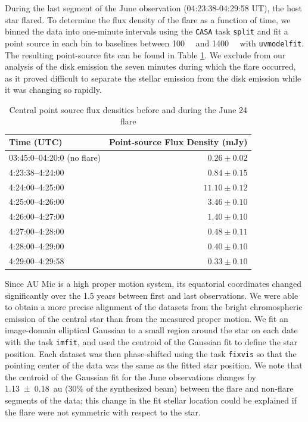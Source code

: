 \documentclass[modern]{aastex62}
\begin{document}
During the last segment of the June observation (04:23:38-04:29:58 UT), the host star flared. 
To determine the flux density of the flare as a function of time, we binned the data into one-minute intervals using the \texttt{CASA} task \texttt{split} and fit a point source in each bin to baselines between \SI{100}{\kilo \lambda} and \SI{1400}{\kilo \lambda} with \texttt{uvmodelfit}. 
The resulting point-source fits can be found in Table \ref{tab:flare fluxes}. 
We exclude from our analysis of the disk emission the seven minutes during which the flare occurred, as it proved difficult to separate the stellar emission from the disk emission while it was changing so rapidly.

\begin{table}	
  \centering
  \begin{tabular}{lr}
    \toprule
    Time (UTC) & Point-source Flux Density (\si{mJy}) \\
    \midrule
    03:45:0--04:20:0 (no flare) & $0.26 \pm 0.02$\\
  	4:23:38--4:24:00 & $0.84  \pm 0.15$ \\
  	4:24:00--4:25:00 & $11.10 \pm 0.12$ \\
  	4:25:00--4:26:00 & $3.46  \pm 0.10$ \\
  	4:26:00--4:27:00 & $1.40  \pm 0.10$ \\
  	4:27:00--4:28:00 & $0.48  \pm 0.11$ \\
  	4:28:00--4:29:00 & $0.40  \pm 0.10$ \\
  	4:29:00--4:29:58 & $0.33  \pm 0.10$\\
    \bottomrule
  \end{tabular}
	\caption{Central point source flux densities before and during the June 24 flare}
  \label{tab:flare fluxes}
\end{table}

Since AU Mic is a high proper motion system, its equatorial coordinates changed significantly over the 1.5 years between first and last observations.  
We were able to obtain a more precise alignment of the datasets from the bright chromospheric emission of the central star than from the measured proper motion.
We fit an image-domain elliptical Gaussian to a small region around the star on each date with the task \texttt{imfit}, and used the centroid of the Gaussian fit to define the star position.
Each dataset was then phase-shifted using the task \texttt{fixvis} so that the pointing center of the data was the same as the fitted star position.
We note that the centroid of the Gaussian fit for the June observations changes by \SI{1.13 \pm 0.18}{au} (30\% of the synthesized beam) between the flare and non-flare segments of the data; this change in the fit stellar location could be explained if the flare were not symmetric with respect to the star.
\end{document}

